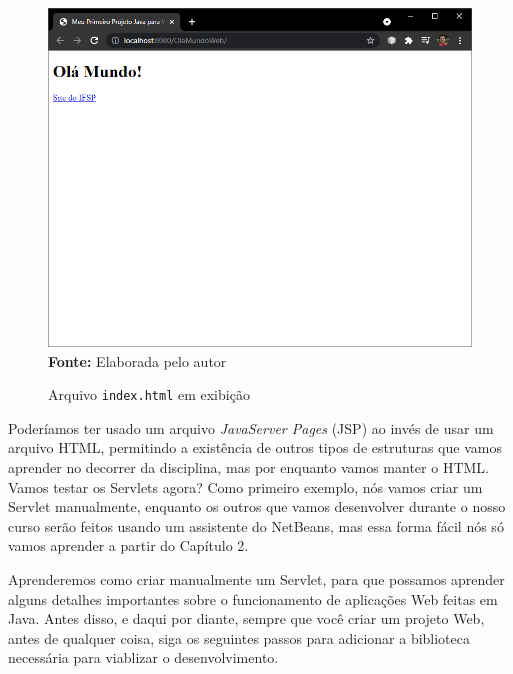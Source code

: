 \FloatBarrier
\begin{figure}[!htbp]
    \centering
    \caption{Arquivo \texttt{index.html} em exibição}
    \includegraphics[scale=0.7]{imagens/cap01OlaMundoIndex}
    \\\textbf{Fonte:} Elaborada pelo autor
    \label{fig:cap01OlaMundoIndex}
\end{figure}
\FloatBarrier

Poderíamos ter usado um arquivo \textit{JavaServer Pages} (JSP) ao invés de usar um arquivo HTML, permitindo a existência de outros tipos de estruturas que vamos aprender no decorrer da disciplina, mas por enquanto vamos manter o HTML. Vamos testar os Servlets agora? Como primeiro exemplo, nós vamos criar um Servlet manualmente, enquanto os outros que vamos desenvolver durante o nosso curso serão feitos usando um assistente do NetBeans, mas essa forma fácil nós só vamos aprender a partir do Capítulo 2.

Aprenderemos como criar manualmente um Servlet, para que possamos aprender alguns detalhes importantes sobre o funcionamento de aplicações Web feitas em Java. Antes disso, e daqui por diante, sempre que você criar um projeto Web, antes de qualquer coisa, siga os seguintes passos para adicionar a biblioteca necessária para viablizar o desenvolvimento.


